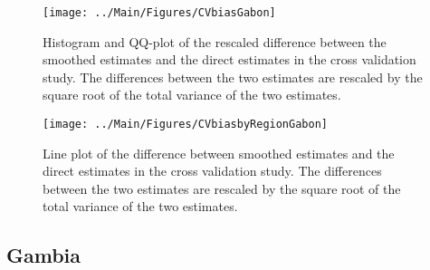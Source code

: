\documentclass[12pt]{article}\usepackage[]{graphicx}\usepackage[]{color}
\newenvironment{knitrout}{}{} %
\begin{document}
\begin{knitrout}
\color{fgcolor}\begin{figure}[bht]

{\centering \texttt{[image: ../Main/Figures/CVbiasGabon]} 

}

\caption[Histogram and QQ-plot of the rescaled difference between the smoothed estimates and the direct estimates in the cross validation study]{Histogram and QQ-plot of the rescaled difference between the smoothed estimates and the direct estimates in the cross validation study. The differences between the two estimates are rescaled by the square root of the total variance of the two estimates.}\label{fig:unnamed-chunk-129}
\end{figure}


\end{knitrout}

\begin{knitrout}
\color{fgcolor}\begin{figure}[bht]

{\centering \texttt{[image: ../Main/Figures/CVbiasbyRegionGabon]} 

}

\caption[Line plot of the difference between smoothed estimates and the direct estimates in the cross validation study]{Line plot of the difference between smoothed estimates and the direct estimates in the cross validation study. The differences between the two estimates are rescaled by the square root of the total variance of the two estimates.}\label{fig:unnamed-chunk-130}
\end{figure}


\end{knitrout}

\clearpage
\subsection{Gambia}


\end{document}

